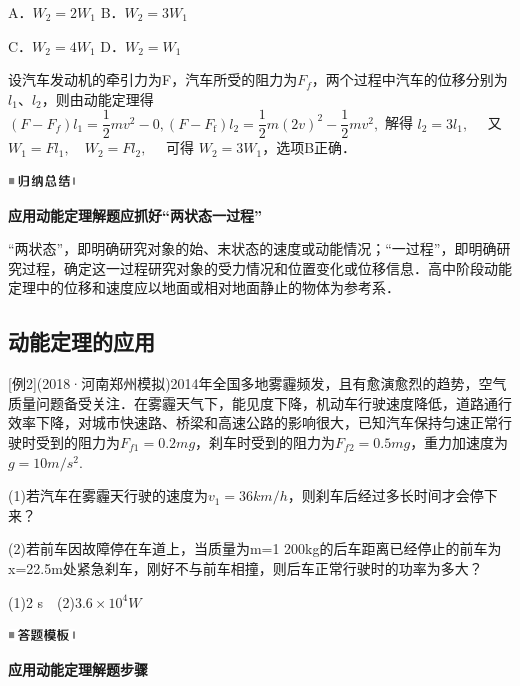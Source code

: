 A．$W_2=2W_1$ B．$W_2=3W_1$

C．$W_2=4W_1$ D．$W_2=W_1$

\begin{solution}
	设汽车发动机的牵引力为F，汽车所受的阻力为$F_f$，两个过程中汽车的位移分别为$l_1$、$l_2$，则由动能定理得$(F-F_f)l_1=\dfrac{1}{2} m v^{2}-0,\left(F-F_{\mathrm{f}}\right) l_{2}=\dfrac{1}{2} m(2 v)^{2}-\dfrac{1}{2} m v^{2},$ 解得 $l_{2}=3 l_{1}, \quad$ 又 $W_{1}=F l_{1}, \quad W_{2}=F l_{2}, \quad$ 可得 $W_{2}=3 W_{1}$，选项B正确．
\end{solution}
\begin{center}\includegraphics[width=0.70764in,height=0.12292in]{media/image13.png}

\textbf{应用动能定理解题应抓好``两状态一过程''}
\end{center}


``两状态''，即明确研究对象的始、末状态的速度或动能情况；``一过程''，即明确研究过程，确定这一过程研究对象的受力情况和位置变化或位移信息．高中阶段动能定理中的位移和速度应以地面或相对地面静止的物体为参考系．


\subsection{动能定理的应用}

{[}例2{]}(2018·河南郑州模拟)2014年全国多地雾霾频发，且有愈演愈烈的趋势，空气质量问题备受关注．在雾霾天气下，能见度下降，机动车行驶速度降低，道路通行效率下降，对城市快速路、桥梁和高速公路的影响很大，已知汽车保持匀速正常行驶时受到的阻力为$F_{f1}=0.2mg$，刹车时受到的阻力为$F_{f2}=0.5mg$，重力加速度为$g=10m/s^2$.

(1)若汽车在雾霾天行驶的速度为$v_1=36km/h$，则刹车后经过多长时间才会停下来？

(2)若前车因故障停在车道上，当质量为m=1 200kg的后车距离已经停止的前车为x=22.5m处紧急刹车，刚好不与前车相撞，则后车正常行驶时的功率为多大？
\begin{solution}
	(1)2 s　(2)$3.6\times 10^4 W$
\end{solution}


\begin{center}\includegraphics[width=0.70764in,height=0.12292in]{media/image25.png}

\textbf{应用动能定理解题步骤}
\end{center}


